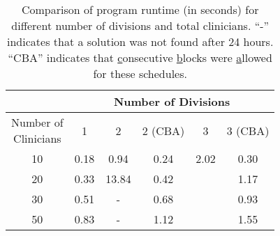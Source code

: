 \begin{table}
	\centering
	\begin{tabular}{|c|c|c|c|c|c|}
		\hline
		                                      & \multicolumn{5}{c|}{Number of Divisions} \\ \hline
		\makecell[l]{Number of \\ Clinicians} &  1   &   2   & 2 (CBA) &  3   & 3 (CBA)  \\ \hline
		                 10                   & 0.18 & 0.94  &  0.24   & 2.02 &   0.30   \\ \hline
		                 20                   & 0.33 & 13.84 &  0.42   &      &   1.17   \\ \hline
		                 30                   & 0.51 &   -   &  0.68   &      &   0.93   \\ \hline
		                 50                   & 0.83 &   -   &  1.12   &      &   1.55   \\ \hline
	\end{tabular}
	\caption{Comparison of program runtime (in seconds) for different number of divisions and total clinicians. ``-'' indicates that a solution was not found after 24 hours. ``CBA'' indicates that \underline{c}onsecutive \underline{b}locks were \underline{a}llowed for these schedules.}
	\label{tbl:runtime-divisions-comparison}%
\end{table}